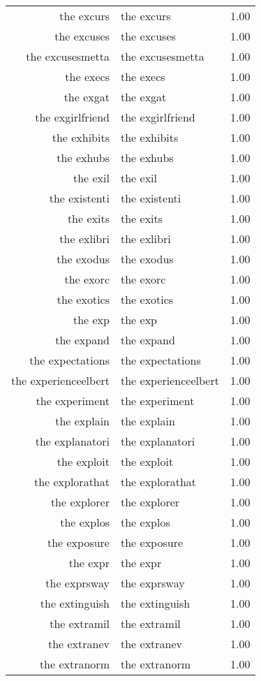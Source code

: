 \begin{table}[ht]
\begin{tabular}{rlr}
  the excurs & the excurs & 1.00 \\ 
  the excuses & the excuses & 1.00 \\ 
  the excusesmetta & the excusesmetta & 1.00 \\ 
  the execs & the execs & 1.00 \\ 
  the exgat & the exgat & 1.00 \\ 
  the exgirlfriend & the exgirlfriend & 1.00 \\ 
  the exhibits & the exhibits & 1.00 \\ 
  the exhubs & the exhubs & 1.00 \\ 
  the exil & the exil & 1.00 \\ 
  the existenti & the existenti & 1.00 \\ 
  the exits & the exits & 1.00 \\ 
  the exlibri & the exlibri & 1.00 \\ 
  the exodus & the exodus & 1.00 \\ 
  the exorc & the exorc & 1.00 \\ 
  the exotics & the exotics & 1.00 \\ 
  the exp & the exp & 1.00 \\ 
  the expand & the expand & 1.00 \\ 
  the expectations & the expectations & 1.00 \\ 
  the experienceelbert & the experienceelbert & 1.00 \\ 
  the experiment & the experiment & 1.00 \\ 
  the explain & the explain & 1.00 \\ 
  the explanatori & the explanatori & 1.00 \\ 
  the exploit & the exploit & 1.00 \\ 
  the explorathat & the explorathat & 1.00 \\ 
  the explorer & the explorer & 1.00 \\ 
  the explos & the explos & 1.00 \\ 
  the exposure & the exposure & 1.00 \\ 
  the expr & the expr & 1.00 \\ 
  the exprsway & the exprsway & 1.00 \\ 
  the extinguish & the extinguish & 1.00 \\ 
  the extramil & the extramil & 1.00 \\ 
  the extranev & the extranev & 1.00 \\ 
  the extranorm & the extranorm & 1.00 \\ 

\end{tabular}
\end{table}
